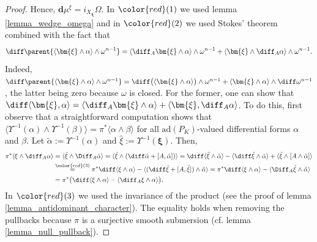 \begin{proof}
    Hence, \(\mathbf{d} \mu^{\bm{}\xi}=i_{X_{\bm{\xi}}} \Omega\). In \({\color{red}(1)}\) we used lemma \ref{lemma_wedge_omega} and in \(\color{red}(2)\) we used Stokes' theorem combined with the fact that 
    \[
    \diff \parent{\langle \bm{\xi} \wedge  \alpha \rangle \wedge \omega^{n-1}}=\langle \diff _A \bm{\xi} \wedge  \alpha \rangle \wedge \omega^{n-1} + \langle \bm{\xi}\wedge  \diff_A \alpha \rangle  \wedge \omega^{n-1}.
    \]
    Indeed, \(\diff \parent{\langle \bm{\xi} \wedge \alpha \rangle \wedge \omega^{n-1}}=\diff \big(\langle \bm{\xi} \wedge \alpha \rangle\big) \wedge \omega^{n-1}+\langle \bm{\xi} \wedge \alpha \rangle\wedge \diff \omega^{n-1}\), the latter being zero because \(\omega\) is closed. For the former, one can show that \(\diff \langle \bm{\xi}, \alpha \rangle = \langle \diff_A \bm{\xi} \wedge \alpha \rangle  + \langle \bm{\xi} , \diff_A \alpha \rangle\). To do this, first observe that a straightforward computation shows that \(\langle \Upsilon^{-1}(\alpha) \wedge \Upsilon^{-1}(\beta)\rangle = \pi^*\langle \alpha \wedge \beta \rangle\) for all \(\mathrm{ad}(P_K)\)-valued differential forms \(\alpha\) and \(\beta\). Let \(\tilde{\alpha}:=\Upsilon^{-1}(\alpha)\) and \(\hat{\xi}:=\Upsilon^{-1}(\bm{\xi})\). Then,
    \begin{align*}
        \pi^* \langle\xi \wedge  \diff_A \alpha \rangle & = \langle\hat{\xi} \wedge \Diff_A \tilde{\alpha} \rangle=\langle \hat{\xi}\wedge (\diff \tilde{\alpha}+[A, \tilde{\alpha} ])  \rangle=\diff \langle \hat{\xi} \wedge \tilde{\alpha}\rangle- \langle\diff \hat{\xi}\wedge  \tilde{\alpha}\rangle + \langle  \hat{\xi}\wedge [A \wedge \tilde{\alpha}] \rangle \\
        & \overset{{\color{red}(3)}}{=} \pi^*\diff \langle\xi \wedge  \alpha \rangle - \langle (\diff \hat\xi + [A, \hat{\xi}]) \wedge \tilde{\alpha}\rangle = \pi^* \diff \langle\xi \wedge  \alpha  \rangle -\langle  \Diff_A \hat{\xi} \wedge \tilde{\alpha}  \rangle \\
        & = \pi^*\big(\diff \langle \xi \wedge \alpha \rangle -\langle\diff_A \xi \wedge \alpha  \rangle\big).
    \end{align*}
    In \(\color{red}(3)\) we used the invariance of the product (see the proof of lemma \ref{lemma_antidominant_character}). The equality holds when removing the pullbacks because \(\pi\) is a surjective smooth submersion (cf. lemma \ref{lemma_null_pullback}).
\end{proof}
